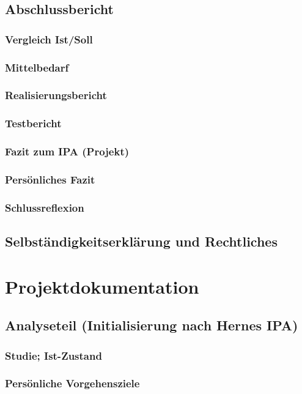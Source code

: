 \documentclass{report}
\begin{document}
\chapter{Abschlussbericht}
\section{Vergleich Ist/Soll}
\section{Mittelbedarf}
\section{Realisierungsbericht}
\section{Testbericht}
\section{Fazit zum IPA (Projekt)}
\section{Persönliches Fazit}
\section{Schlussreflexion}

\chapter{Selbständigkeitserklärung und Rechtliches}

\part{Projektdokumentation}

\chapter{Analyseteil (Initialisierung nach Hernes IPA)}
\section{Studie; Ist-Zustand}
\section{Persönliche Vorgehensziele}
\end{document}
